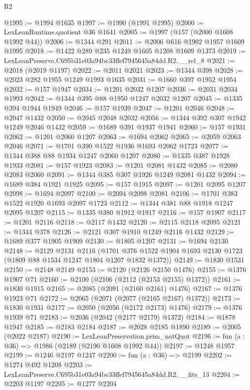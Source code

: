 \begin{lexlean}{R2}
\begin{coremodule}
@1995 := @1994 @1635
@1997 := @1990 (@1991 @1995)
@2000 := LexLeanRuntime.quotient @36 @1641
@2005 := @1997 (@157 (@2000 @1608 @1992 @44))
@2006 := @1344 @291
@2011 := @2006 @616 @1902 @1957 @1609 @1995
@2018 := @1422 @289 @235 @1249 @1605 @1208 @1609 @1373
@2019 := LexLeanPreserve.C695b31e03a94bc33ffef7945645a84dd.R2.__rel_8
@2021 := @2018 (@2019 @1197)
@2022 := @2011 @2021
@2023 := @1344 @398
@2028 := @2023 @282 @1955 @1249 @1993 @1635
@2031 := @1660 @397 @1952 @1954
@2032 := @157 @1947
@2034 := @1201 @2032 @1207
@2036 := @2031 @2034 @1993
@2042 := @1344 @395 @88 @1950 @1247 @2032 @1207
@2045 := @1335 @394 @1944 @1949
@2046 := @157 @1939
@2047 := @1201 @2046
@2048 := @2047 @1432
@2050 := @2045 @2048 @2032
@2056 := @1344 @392 @307 @1942 @1249 @2046 @1432
@2059 := @1689 @391 @1937 @1941
@2060 := @157 @1931
@2062 := @1201 @2060 @1207
@2063 := @1694 @2062
@2065 := @2059 @2063 @2046
@2071 := @1701 @390 @1522 @1936 @1693 @2062 @1723
@2077 := @1344 @388 @88 @1934 @1247 @2060 @1207
@2080 := @1335 @387 @1928 @1933
@2081 := @157 @1923
@2083 := @1201 @2081 @1432
@2085 := @2080 @2083 @2060
@2091 := @1344 @385 @307 @1926 @1249 @2081 @1432
@2094 := @1689 @384 @1921 @1925
@2095 := @157 @1915
@2097 := @1201 @2095 @1207
@2098 := @1694 @2097
@2100 := @2094 @2098 @2081
@2106 := @1701 @383 @1522 @1920 @1693 @2097 @1723
@2112 := @1344 @381 @88 @1918 @1247 @2095 @1207
@2115 := @1335 @380 @1912 @1917
@2116 := @157 @1907
@2117 := @1201 @2116
@2118 := @2117 @1432
@2120 := @2115 @2118 @2095
@2121 := @1344 @378
@2126 := @2121 @307 @1910 @1249 @2116 @1432
@2129 := @1689 @377 @1905 @1909
@2130 := @1805 @1207
@2131 := @1694 @2130
@2148 := @2129
    @2131
    @2116
    (@1701 @376 @1522 @1904 @1693 @2130 @1723 (@1809 @88 @1534 @1247 @1804 @1207 @1832 @1372))
@2149 := @1830 @1531
@2150 := @2148 @2149
@2153 := @2120 (@2126 @2150 @1476)
@2155 := @1376 @1907 @71
@2160 := @2100 (@2106 (@2112 (@2153 @2155) @1372))
@2161 := @1830 @1915
@2165 := @2085 (@2091 (@2160 @2161) @1476)
@2167 := @1376 @1923 @71
@2172 := @2065 (@2071 (@2077 (@2165 @2167) @1372))
@2173 := @1830 @1931
@2177 := @2050 (@2056 (@2172 @2173) @1476)
@2179 := @1376 @1939 @71
@2183 := @2036 (@2042 (@2177 @2179) @1372)
@2184 := @1878 @1947
@2185 := @2183 @2184
@2187 := @2028 @2185 @1890
@2189 := @2005 (@2022 @2187)
@2190 := LexLeanPreservation.prim_natQuot
@2196 := fun (a : @36) => @1986 (@2189 (@2190 @1608 @1992 @44))
@2197 := @1248 @1957
@2199 := @1246 @2197 @1247
@2200 := fun (a : @36) => @2199
@2202 := @1274 @492 @1208
@2203 := LexLeanPreserve.C695b31e03a94bc33ffef7945645a84dd.R2.__fits_13
@2204 := @2203 @1197
@2205 := @1277 @2204

\end{coremodule}
\end{lexlean}
